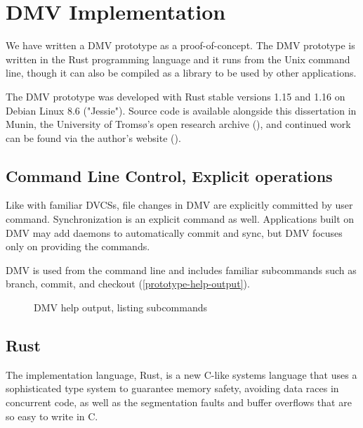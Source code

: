 \chapter{DMV Implementation}

We have written a \gls{DMV} prototype as a proof-of-concept. The \gls{DMV}
prototype is written in the Rust programming language and it runs from the Unix
command line, though it can also be compiled as a library to be used by other
applications.

The \gls{DMV} prototype was developed with Rust stable versions 1.15 and 1.16 on
Debian Linux 8.6 ("Jessie"). Source code is available alongside this
dissertation in Munin, the University of Tromsø's open research archive
(\muninurl), and continued work can be found via the author's website (\dmvurl).

%


\section{Command Line Control, Explicit operations}

Like with familiar \glspl{DVCS}, file changes in \gls{DMV} are explicitly
committed by user command. Synchronization is an explicit command as well.
Applications built on \gls{DMV} may add daemons to automatically \gls{commit}
and sync, but \gls{DMV} focuses only on providing the commands.

\gls{DMV} is used from the command line and includes familiar subcommands such
as branch, \gls{commit}, and checkout
(\autoref{prototype-help-output}).

\begin{figure}[]
    \caption{DMV help output, listing subcommands}
    \label{prototype-help-output}


\end{figure}

%


\section{Rust}

The implementation language, Rust, is a new C-like systems language that uses a
sophisticated type system to guarantee memory safety\cite{rust_acm_sigada},
avoiding data races in concurrent code, as well as the segmentation faults and
buffer overflows that are so easy to write in C.

